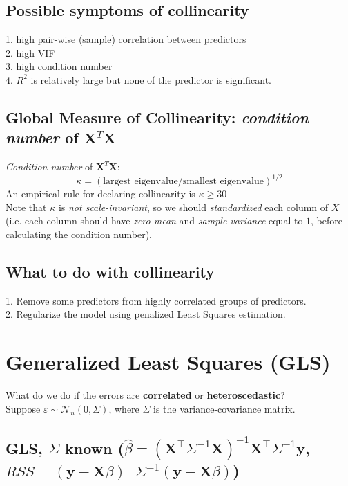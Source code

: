 \documentclass[11pt,a4paper]{article}
\begin{document}
\subsection{Possible symptoms of collinearity}
1. high pair-wise (sample) correlation between predictors\\
2. high VIF\\
3. high condition number\\
4. $R^2$ is relatively large but none of the predictor is signiﬁcant.

\subsection{Global Measure of Collinearity: \textit{condition number} of $\mathbf{X}^T \mathbf{X}$}
\textit{Condition number} of $\mathbf{X}^T \mathbf{X}$:
$$\kappa=(\text{largest eigenvalue/smallest eigenvalue})^{1/2}$$
An empirical rule for declaring collinearity is $\kappa\geq 30$\\
Note that $\kappa$ is \textit{not scale-invariant}, so we should \textit{standardized} each column of $X$ (i.e. each column should have \textit{zero mean} and \textit{sample variance} equal to $1$, before calculating the condition number).

\subsection{What to do with collinearity}
1. Remove some predictors from highly correlated groups of predictors.\\
2. Regularize the model using penalized Least Squares estimation.





\section{Generalized Least Squares (GLS)}
What do we do if the errors are \textbf{correlated} or \textbf{heteroscedastic}?\\
Suppose $\varepsilon \sim \mathcal{N}_{n}(0, \Sigma)$, where $\Sigma$ is the variance-covariance matrix.
\subsection{GLS, $\Sigma$ known ($\hat{\beta}=\left(\mathbf{X}^{\top} \Sigma^{-1} \mathbf{X}\right)^{-1} \mathbf{X}^{\top} \Sigma^{-1} \mathbf{y}$, ${RSS}=(\mathbf{y}-\mathbf{X} \beta)^{\top} \Sigma^{-1}(\mathbf{y}-\mathbf{X} \beta)$)}
\end{document}
